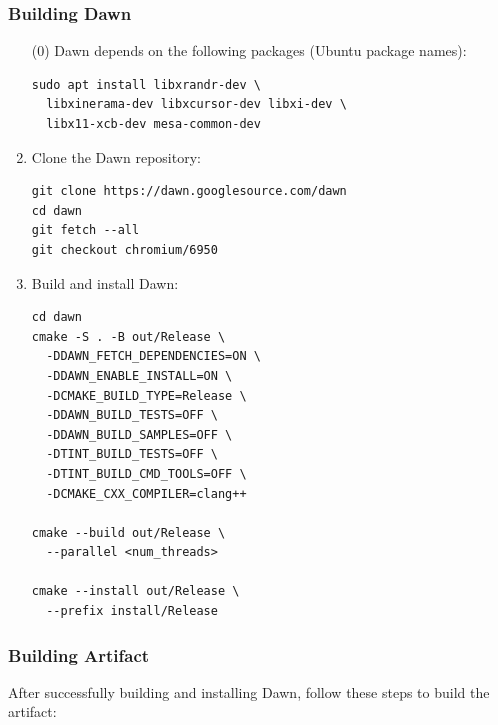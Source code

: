 \documentclass[sigconf]{acmart}
\begin{document}
\subsubsection{Building Dawn}
\begin{enumerate}
  \item[(0)] Dawn depends on the following packages (Ubuntu package names):
        \begin{lstlisting}[basicstyle=\ttfamily\small, frame=single]
sudo apt install libxrandr-dev \
  libxinerama-dev libxcursor-dev libxi-dev \
  libx11-xcb-dev mesa-common-dev
  \end{lstlisting}

  \item Clone the Dawn repository:
        \begin{lstlisting}[basicstyle=\ttfamily\small, frame=single]
git clone https://dawn.googlesource.com/dawn
cd dawn
git fetch --all
git checkout chromium/6950
  \end{lstlisting}

  \item Build and install Dawn:
        \begin{lstlisting}[basicstyle=\ttfamily\small, frame=single]
cd dawn
cmake -S . -B out/Release \
  -DDAWN_FETCH_DEPENDENCIES=ON \
  -DDAWN_ENABLE_INSTALL=ON \
  -DCMAKE_BUILD_TYPE=Release \
  -DDAWN_BUILD_TESTS=OFF \
  -DDAWN_BUILD_SAMPLES=OFF \
  -DTINT_BUILD_TESTS=OFF \
  -DTINT_BUILD_CMD_TOOLS=OFF \
  -DCMAKE_CXX_COMPILER=clang++

cmake --build out/Release \
  --parallel <num_threads>

cmake --install out/Release \
  --prefix install/Release
  \end{lstlisting}
\end{enumerate}

\subsubsection{Building Artifact}
After successfully building and installing Dawn, follow these steps to build the artifact:
\end{document}
